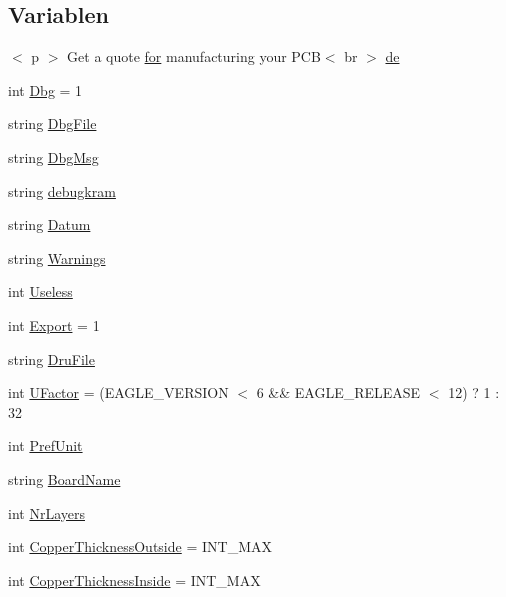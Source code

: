 \subsection*{Variablen}
\begin{DoxyCompactItemize}
\item 
$<$ p $>$ Get a quote \hyperlink{test_8ulp_a7ff0a764a1a161522eb0e1c3b7981d20}{for} manufacturing your P\+C\+B$<$ br $>$ \hyperlink{_l_p-_daten_8ulp_a6de8b8849fbee63bd72b5f38731e998a}{de}
\item 
int \hyperlink{_l_p-_daten_8ulp_ae22172296e8719c35db905a207fcdb56}{Dbg} = 1
\item 
string \hyperlink{_l_p-_daten_8ulp_a797bf1dcb6e1aec11a1b60fd7a3c1a4f}{Dbg\+File}
\item 
string \hyperlink{_l_p-_daten_8ulp_ae2c2fa64831f7aec6e2649da184fb47a}{Dbg\+Msg}
\item 
string \hyperlink{_l_p-_daten_8ulp_af70accd3259e060f8b6104caba740774}{debugkram}
\item 
string \hyperlink{_l_p-_daten_8ulp_a56c3cee34ae375ca5905f9888799632f}{Datum}
\item 
string \hyperlink{_l_p-_daten_8ulp_a8b775f7be4cc29c7bd924e870dc67b64}{Warnings}
\item 
int \hyperlink{_l_p-_daten_8ulp_aa7101a3f84189d12615e8fac74b8eee4}{Useless}
\item 
int \hyperlink{_l_p-_daten_8ulp_adf2045ae5ac7e107d6e841f6c9d3cbce}{Export} = 1
\item 
string \hyperlink{_l_p-_daten_8ulp_a7c0022cc032cc2fde01371951fae88b5}{Dru\+File}
\item 
int \hyperlink{_l_p-_daten_8ulp_af00947d6126fb9daaee10391a57f27d0}{U\+Factor} = (E\+A\+G\+L\+E\+\_\+\+V\+E\+R\+S\+I\+O\+N $<$ 6 \&\& E\+A\+G\+L\+E\+\_\+\+R\+E\+L\+E\+A\+S\+E $<$ 12) ? 1 \+: 32
\item 
int \hyperlink{_l_p-_daten_8ulp_a9cd76f4a7dccdb177ae9e523cf852394}{Pref\+Unit}
\item 
string \hyperlink{_l_p-_daten_8ulp_ae174b40cb33b09a863149fee067990ee}{Board\+Name}
\item 
int \hyperlink{_l_p-_daten_8ulp_a6e55f2f64597e3d0e71851f3aefca474}{Nr\+Layers}
\item 
int \hyperlink{_l_p-_daten_8ulp_a326dc1deac8160555dd3d7d159007be3}{Copper\+Thickness\+Outside} = I\+N\+T\+\_\+\+M\+A\+X
\item 
int \hyperlink{_l_p-_daten_8ulp_aeeba5b9f7a94fe76ac9dc01647a293ff}{Copper\+Thickness\+Inside} = I\+N\+T\+\_\+\+M\+A\+X
\item 

\end{DoxyCompactItemize}
